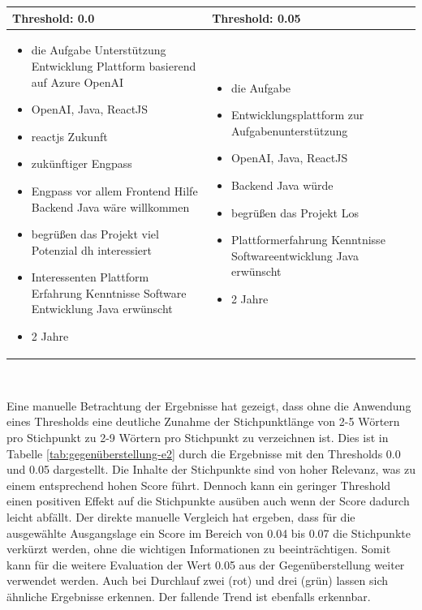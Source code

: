 \begin{center}
	\begin{tabularx}{1\textwidth} { 
			| >{\raggedright\arraybackslash}X 
			|| >{\raggedright\arraybackslash}X | }
		\hline
		Threshold: 0.0
		& Threshold: 0.05 \\
		\hline
		\begin{itemize}[topsep=0pt]
			\itemsep-0.5em
			\item die Aufgabe Unterstützung Entwicklung Plattform basierend auf Azure OpenAI
			\item OpenAI, Java, ReactJS
			\item reactjs Zukunft
			\item zukünftiger Engpass
			\item Engpass vor allem Frontend Hilfe Backend Java wäre willkommen
			\item begrüßen das Projekt viel Potenzial dh interessiert
			\item Interessenten Plattform Erfahrung Kenntnisse Software Entwicklung Java erwünscht
			\item 2 Jahre
		\end{itemize} & \begin{itemize}[topsep=0pt]
		\itemsep-0.5em
		\item die Aufgabe
		\item Entwicklungsplattform zur Aufgabenunterstützung
		\item OpenAI, Java, ReactJS
		\item Backend Java würde
		\item begrüßen das Projekt Los
		\item Plattformerfahrung Kenntnisse Softwareentwicklung Java erwünscht
		\item 2 Jahre
		\end{itemize}\\
		\hline
	\end{tabularx}\\
	\label{tab:gegenüberstellung-e2}
\end{center}
Eine manuelle Betrachtung der Ergebnisse hat gezeigt, dass ohne die Anwendung eines Thresholds eine deutliche Zunahme der Stichpunktlänge von 2-5 Wörtern pro Stichpunkt zu 2-9 Wörtern pro Stichpunkt zu verzeichnen ist. Dies ist in Tabelle \ref{tab:gegenüberstellung-e2} durch die Ergebnisse mit den Thresholds 0.0 und 0.05 dargestellt. Die Inhalte der Stichpunkte sind von hoher Relevanz, was zu einem entsprechend hohen Score führt. Dennoch kann ein geringer Threshold einen positiven Effekt auf die Stichpunkte ausüben auch wenn der Score dadurch leicht abfällt. Der direkte manuelle Vergleich hat ergeben, dass für die ausgewählte Ausgangslage ein Score im Bereich von 0.04 bis 0.07 die Stichpunkte verkürzt werden, ohne die wichtigen Informationen zu beeinträchtigen. Somit kann für die weitere Evaluation der Wert 0.05 aus der Gegenüberstellung weiter verwendet werden. Auch bei Durchlauf zwei (rot) und drei (grün) lassen sich ähnliche Ergebnisse erkennen. Der fallende Trend ist ebenfalls erkennbar.
